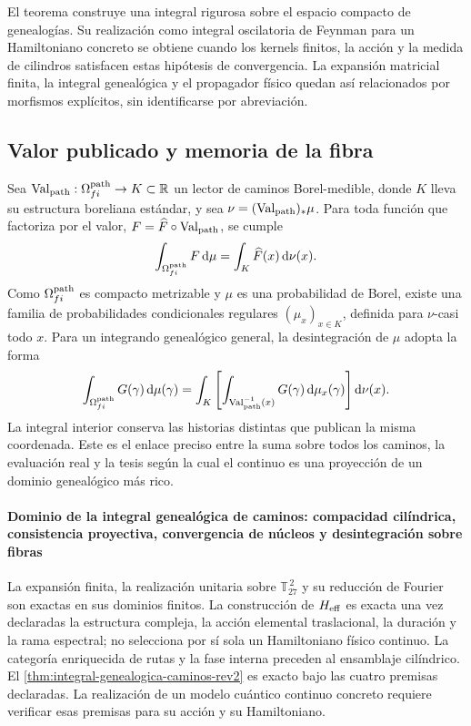 El teorema construye una integral rigurosa sobre el espacio compacto de
genealogías. Su realización como integral oscilatoria de Feynman para un
Hamiltoniano concreto se obtiene cuando los kernels finitos, la acción y la
medida de cilindros satisfacen estas hipótesis de convergencia. La expansión
matricial finita, la integral genealógica y el propagador físico quedan así
relacionados por morfismos explícitos, sin identificarse por abreviación.

\subsection{Valor publicado y memoria de la fibra}

Sea
\(\operatorname{Val}_{\rm path}:\Omega^{\rm path}_{fi}\to K\subset\mathbb R\)
un lector de caminos Borel-medible, donde \(K\) lleva su estructura
boreliana estándar, y sea
\(\nu=(\operatorname{Val}_{\rm path})_*\mu\). Para toda función que
factoriza por el valor, \(F=\widehat F\circ\operatorname{Val}_{\rm path}\),
se cumple
\[
 \int_{\Omega^{\rm path}_{fi}}F\,\mathrm d\mu
 =\int_K\widehat F(x)\,\mathrm d\nu(x).
\]
Como \(\Omega^{\rm path}_{fi}\) es compacto metrizable y \(\mu\) es una
probabilidad de Borel, existe una familia de probabilidades condicionales
regulares \((\mu_x)_{x\in K}\), definida para \(\nu\)-casi todo \(x\). Para
un integrando genealógico general, la desintegración de \(\mu\) adopta la forma
\begin{equation}
 \int_{\Omega^{\rm path}_{fi}}G(\gamma)\,\mathrm d\mu(\gamma)
 =\int_K\left[
   \int_{\operatorname{Val}_{\rm path}^{-1}(x)}
   G(\gamma)\,\mathrm d\mu_x(\gamma)
  \right]\mathrm d\nu(x).
 \label{eq:desintegracion-genealogica-caminos-rev2}
\end{equation}
La integral interior conserva las historias distintas que publican la misma
coordenada. Este es el enlace preciso entre la suma sobre todos los caminos,
la evaluación real y la tesis según la cual el continuo es una proyección de
un dominio genealógico más rico.

\paragraph{Dominio de la integral genealógica de caminos: compacidad cilíndrica, consistencia proyectiva, convergencia de núcleos y desintegración sobre fibras}
La expansión finita, la realización unitaria sobre
\(\mathbb T_{27}^{\,2}\) y su reducción de Fourier son exactas en sus dominios
finitos. La construcción de \(H_{\rm eff}\) es
exacta una vez declaradas la estructura compleja, la acción elemental
traslacional, la duración y la rama espectral; no selecciona por sí sola un
Hamiltoniano físico continuo. La categoría enriquecida de rutas y la fase
interna preceden al ensamblaje cilíndrico. El
\cref{thm:integral-genealogica-caminos-rev2} es exacto bajo las cuatro
premisas declaradas. La realización de un modelo cuántico continuo concreto
requiere verificar esas premisas para su acción y su Hamiltoniano.

